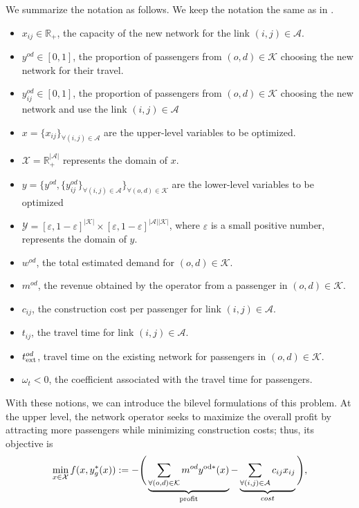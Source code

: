\documentclass{article}
\theoremstyle{plain}
\theoremstyle{definition}
\theoremstyle{remark}
\begin{document}
We summarize the notation as follows. We keep the notation the same as in \cite{jiang2024primal}.
\begin{itemize}
    \item $x_{ij} \in \mathbb{R}_+$, the capacity of the new network for the link $(i,j) \in \mathcal{A}$.
    \item $y^{od} \in [0,1]$, the proportion of passengers from $(o,d) \in \mathcal{K}$ choosing the new network for their travel.
    \item $y_{ij}^{od} \in [0,1]$, the proportion of passengers from $(o,d) \in \mathcal{K}$ choosing the new network and use the link $(i,j) \in \mathcal{A}$
    \item $x=\{x_{ij}\}_{\forall (i,j)\in\mathcal{A}}$ are the upper-level variables to be optimized. 
    \item $\mathcal{X} = \mathbb{R}^{|\mathcal{A}|}_+$ represents the domain of $x$.
    \item $y=\{y^{od}, \{y_{ij}^{od}\}_{\forall (i,j)\in\mathcal{A}}\}_{\forall (o,d)\in\mathcal{K}}$ are the lower-level variables to be optimized
    \item $\mathcal{Y} = [\varepsilon,1-\varepsilon]^{|\mathcal{K}|}\times[\varepsilon,1-\varepsilon]^{|\mathcal{A}||\mathcal{K}|}$, where $\varepsilon$ is a small positive number, represents the domain of $y$.
    \item $w^{od}$, the total estimated demand for $(o,d) \in \mathcal{K}$.
    \item $m^{od}$, the revenue obtained by the operator from a passenger in $(o,d) \in \mathcal{K}$.
    \item $c_{ij}$, the construction cost per passenger for link $(i,j) \in \mathcal{A}$.
    \item $t_{ij}$, the travel time for link $(i,j) \in \mathcal{A}$.
    \item $t_{\rm ext}^{od}$, travel time on the existing network for passengers in $(o,d) \in \mathcal{K}$.
    \item $\omega_t<0$, the coefficient associated with the travel time for passengers. 
\end{itemize}
With these notions, we can introduce the bilevel formulations of this problem. 
At the upper level, the network operator seeks to maximize the overall profit by attracting more passengers while minimizing construction costs; thus, its objective is
\begin{equation}\label{eq:appTransSingleEntropy}
\min_{x\in \mathcal{X}}f(x,y^*_g(x)) := - \Bigg( \underbrace{\sum_{\forall (o,d) \in \mathcal{K}}m^{od}y^{\rm od*}(x) }_{\text{profit}} -  \underbrace{\sum_{\forall (i,j) \in \mathcal{A}}c_{ij}x_{ij} }_{cost} \Bigg),    
\end{equation}
\end{document}
